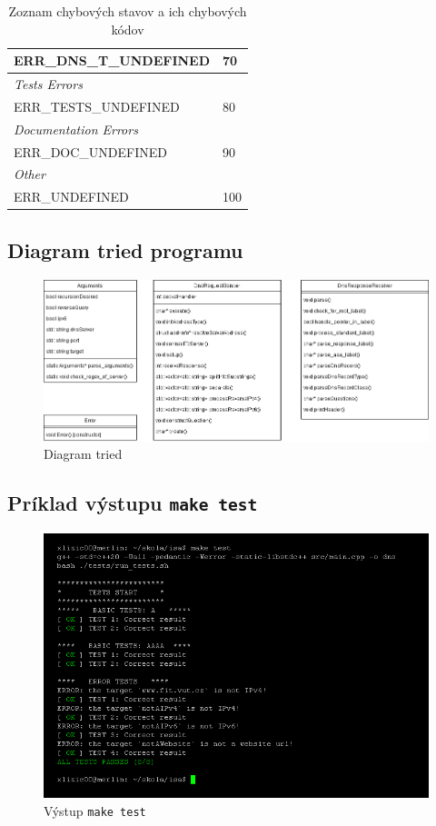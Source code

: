 \documentclass[a4paper, 11pt]{article}
\begin{document}
\begin{table}[h]
\begin{tabularx}{\textwidth}{|X|l|}
		ERR\_DNS\_T\_UNDEFINED                 & 70                  \\ \hline
		\multicolumn{2}{|X|}{\textit{Tests Errors}}                    \\ \hline
		ERR\_TESTS\_UNDEFINED                  & 80                  \\ \hline
		\multicolumn{2}{|X|}{\textit{Documentation Errors}}            \\ \hline
		ERR\_DOC\_UNDEFINED                    & 90                  \\ \hline
		\multicolumn{2}{|X|}{\textit{Other}}                           \\ \hline
		ERR\_UNDEFINED                         & 100                 \\ \hline
		\end{tabularx}
		\caption{Zoznam chybových stavov a ich chybových kódov}
		\label{tab:errors}
	\end{table}
		
	\newpage
	\subsection{Diagram tried programu}
	\label{subsection:res_classDiagram}
	\begin{figure}[ht]
		\centering
		\includegraphics[width=1 \linewidth]{res/classDiagram.png}

		\caption{Diagram tried}
	\end{figure}

	\newpage
	\subsection{Príklad výstupu \texttt{make test}}
	\label{subsection:res_tests}
	\begin{figure}[ht]
		\centering
		\includegraphics[width=1 \linewidth]{res/tests.png}

		\caption{Výstup \texttt{make test}}
	\end{figure}
\end{document}
